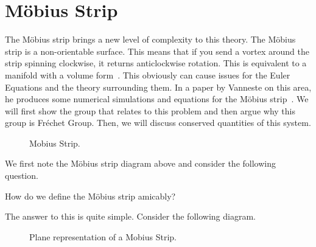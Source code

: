 
\section{M\"{o}bius Strip}

The M\"obius strip brings a new level of complexity to this theory. The M\"obius strip is a non-orientable surface. This means that if you send a vortex around the strip spinning clockwise, it returns anticlockwise rotation. This is equivalent to a manifold with a volume form~\cite{Tu}. This obviously can cause issues for the Euler Equations and the theory surrounding them. In a paper by Vanneste on this area, he produces some numerical simulations and equations for the M\"obius strip~\cite{vanneste_2021}. We will first show the group that relates to this problem and then argue why this group is Fr\'echet Group. Then, we will discuss conserved quantities of this system.

\begin{figure}[!ht]
\centering
\resizebox{0.45\textwidth}{!}{}
\caption{Mobius Strip.}
\label{fig:mobius}
\end{figure}

\noindent
We first note the M\"obius strip diagram above and consider the following question.
\begin{question}
  How do we define the M\"obius strip amicably?
\end{question}
\noindent
The answer to this is quite simple. Consider the following diagram.

\begin{figure}[!ht]
\centering
\resizebox{0.35\textwidth}{!}{}
\caption{Plane representation of a Mobius Strip.}
\label{fig:mobius}
\end{figure}

